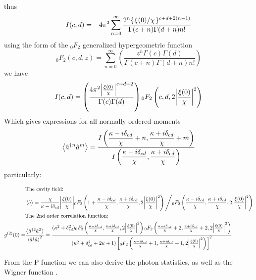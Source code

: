 thus
\begin{equation}
  I(c, d) = -4\pi^2 \sum_{n=0}^\infty \frac{2^n \{\flatfrac{\xi(0)}{\chi}\}^{c+d+2(n-1)}}{\Gamma(c+n)\Gamma(d+n)n!}
\end{equation}
using the form of the $_0F_2$ generalized hypergeometric function \cite{Slater1966} \cite{TISP}
\begin{equation}
  _0F_2(c, d, z) = \sum_{n=0}^\infty \left( \frac{ z^n \Gamma(c) \Gamma(d)}{\Gamma(c+n)\Gamma(d+n)n!} \right)
\end{equation}
we have 
\begin{equation}
  I(c, d) = \left( \frac{4\pi^2 \abs{\frac{\xi(0)}{\chi}}^{c+d-2}}{\Gamma(c)\Gamma(d)} \right) {}_0F_2 \left(c, d, 2\abs{\frac{\xi(0)}{\chi}}^2\right)
\end{equation}
Which gives expressions for all normally ordered moments 
\begin{equation}
  \ev{\cre{}^n \ann^m} = \displaystyle \frac{\displaystyle I\left(\frac{\kappa-i\delta_{cd}}{\chi}+n, \frac{\kappa+i\delta_{cd}}{\chi}+m\right)}{\displaystyle I\left(\frac{\kappa-i\delta_{cd}}{\chi}, \frac{\kappa+i\delta_{cd}}{\chi}\right)}
\end{equation}
particularly:
\begin{widetext}
  \begin{align}
    &\text{The cavity field: }\nonumber\\ 
    &\ev{\ann} = \frac{\chi}{\kappa-i\delta_{cd}} \abs{\frac{\xi(0)}{\chi}} {}_0F_2\left(1+ \frac{\kappa-i\delta_{cd}}{\chi}, \frac{\kappa+i\delta_{cd}}{\chi}, 2\abs{\frac{\xi(0)}{\chi}}^2\right) \Bigg/ {}_0F_2 \left(\frac{\kappa-i\delta_{cd}}{\chi}, \frac{\kappa+i\delta_{cd}}{\chi}, 2\abs{\frac{\xi(0)}{\chi}}^2\right)\label{field_duff}\\
    &\text{The 2nd order correlation function: }\nonumber\\
    g^{(2)}(0) =& \frac{\ev{\cre{}^2 \ann{}^2}}{\ev{\cre\ann}^2} =  \cfrac{(\kappa^2 + \delta_{cd}^2){}_0F_2 \left( \frac{\kappa - i \delta_{cd}}{\chi}, \frac{\kappa+i\delta_{cd}}{\chi}, 2\abs{\frac{\xi(0)}{\chi}}^2 \right) {}_0F_2 \left( \frac{\kappa-i\delta_{cd}}{\chi}+2, \frac{\kappa+i\delta_{cd}}{\chi}+2, 2\abs{\frac{\xi(0)}{\chi}}^2 \right)}{(\kappa^2 + \delta_{cd}^2 + 2 \kappa + 1) \left[{}_0F_2\left(\frac{\kappa-i\delta_{cd}}{\chi}+1, \frac{\kappa+i\delta_{cd}}{\chi}+1, 2\abs{\frac{\xi(0)}{\chi}}^2 \right)\right]^2} \label{g2_duff}
  \end{align}
\end{widetext}
From the P function we can also derive the photon statistics, as well as the Wigner function \cite{Kheruntsyan1999}.

